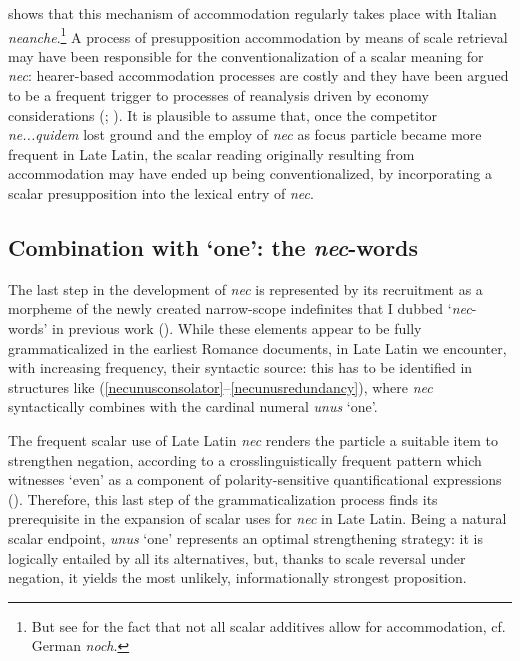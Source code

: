 \documentclass[output=paper]{langsci/langscibook}
\begin{document}
\citet{Tovena06} shows that this mechanism of accommodation regularly takes place with Italian {\emph{neanche}}.{\footnote{But see \citet{Umbach12} for the fact that not all scalar additives allow for accommodation, cf. German {\emph{noch}}.}} A process of presupposition accommodation by means of scale retrieval may have been responsible for the conventionalization of a scalar meaning for {\emph{nec}}: hearer-based accommodation processes are costly and they have been argued to be a frequent trigger to processes of reanalysis driven by economy considerations (\citealt[]{TraugottDasher02, Eckardt2006}; \citealt[]{SchwenterWaltereit10}). It is plausible to assume that, once the competitor {\emph{ne...quidem}} lost ground and the employ of {\emph{nec}} as focus particle became more frequent in Late Latin, the scalar reading originally resulting from accommodation may have ended up being conventionalized, by incorporating a scalar presupposition into the lexical entry of {\emph{nec}}.

\subsection{Combination with `one': the {\emph{nec}}-words} \label{necwordssection}

The last step in the development of {\emph{nec}} is represented by its recruitment as a morpheme of the newly created narrow-scope indefinites that I dubbed `{\emph{nec}}-words' in previous work (\citealt[chapter 5]{Gianollo18}). While these elements appear to be fully grammaticalized in the earliest Romance documents, in Late Latin we encounter, with increasing frequency, their syntactic source: this has to be identified in structures like (\ref{necunusconsolator}--\ref{necunusredundancy}), where {\emph{nec}} syntactically combines with the cardinal numeral {\emph{unus}} `one'.

The frequent scalar use of Late Latin {\emph{nec}} renders the particle a suitable item to strengthen negation, according to a crosslinguistically frequent pattern which witnesses `even' as a component of polarity-sensitive quantificational expressions (\citealt[]{Haspelmath1997, Lahiri98, Watanabe04, Chierchia:2013}). Therefore, this last step of the grammaticalization process finds its prerequisite in the expansion of scalar uses for {\emph{nec}} in Late Latin. Being a natural scalar endpoint, {\emph{unus}} `one' represents an optimal strengthening strategy: it is logically entailed by all its alternatives, but, thanks to scale reversal under negation, it yields the most unlikely, informationally strongest proposition.
\end{document}
